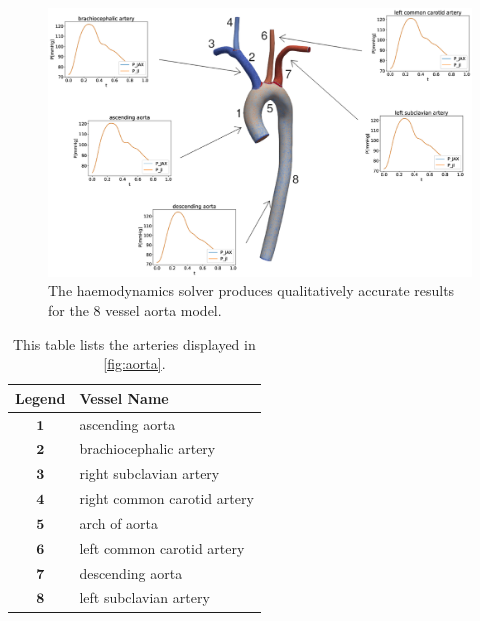 \documentclass[a4paper, oneside]{discothesis}
\begin{document}
\begin{figure} [!h]
	\centering
	\includegraphics[width=0.8\columnwidth]{figures/0007.eps}
	\caption{The haemodynamics solver produces qualitatively accurate results for the 8 vessel aorta model.}
	\label{fig:aorta}
\end{figure}

\begin{table}[!h] 
	\begin{center}
		\begin{tabular}{|c|l|} 
			\hline
			Legend & Vessel Name\\
			\hline
			$\mathbf{1}$& ascending aorta \\ 
			$\mathbf{2}$& brachiocephalic artery \\
			$\mathbf{3}$& right subclavian artery \\
			$\mathbf{4}$& right common carotid artery \\
			$\mathbf{5}$& arch of aorta \\
			$\mathbf{6}$& left common carotid artery \\
			$\mathbf{7}$& descending aorta \\
			$\mathbf{8}$& left subclavian artery \\
			\hline
		\end{tabular}
	\end{center}
	\caption{This table lists the arteries displayed in \autoref{fig:aorta}.}
	\label{tab:aort}
\end{table}
\end{document}
